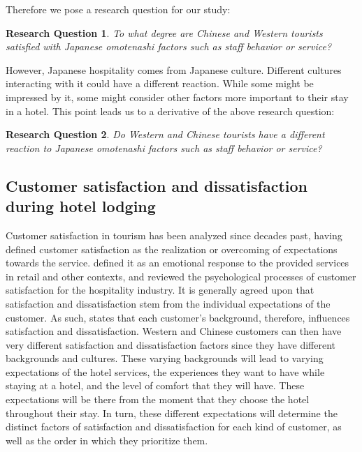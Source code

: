\documentclass[smallextended,natbib]{svjour3}       %
\makeatletter
\newtheorem{rsq}{Research Question}
\newcounter{subrsq}
\newenvironment{subrsq}
         {%
          \setcounter{subrsq}{0}%
          \stepcounter{rsq}%
          \edef\saved@rsq{\thersq}%
          \let\c@rsq\c@subrsq     %
          \renewcommand{\thersq}{\saved@rsq\alph{rsq}}%
         }
         {}
\makeatother
\begin{document}
    Therefore we pose a research question for our study:

    \begin{subrsq}
    \begin{rsq}
    \label{rsq:omotenashi}
    To what degree are Chinese and Western tourists satisfied with Japanese \textit{omotenashi} factors such as staff behavior or service?
    \end{rsq}

    However, Japanese hospitality comes from Japanese culture. Different cultures interacting with it could have a different reaction. While some might be impressed by it, some might consider other factors more important to their stay in a hotel. This point leads us to a derivative of the above research question:

    \begin{rsq}
    \label{rsq:omotenashi_both}
    Do Western and Chinese tourists have a different reaction to Japanese \textit{omotenashi} factors such as staff behavior or service?
    \end{rsq}
    \end{subrsq}

  \subsection{Customer satisfaction and dissatisfaction during hotel lodging}\label{theory_satisfaction}

    Customer satisfaction in tourism has been analyzed since decades past, \cite{hunt1975} having defined customer satisfaction as the realization or overcoming of expectations towards the service. \cite{oliver1981} defined it as an emotional response to the provided services in retail and other contexts, and \cite{oh1996} reviewed the psychological processes of customer satisfaction for the hospitality industry. It is generally agreed upon that satisfaction and dissatisfaction stem from the individual expectations of the customer. As such, \cite{engel1990} states that each customer's background, therefore, influences satisfaction and dissatisfaction. Western and Chinese customers can then have very different satisfaction and dissatisfaction factors since they have different backgrounds and cultures. These varying backgrounds will lead to varying expectations of the hotel services, the experiences they want to have while staying at a hotel, and the level of comfort that they will have. These expectations will be there from the moment that they choose the hotel throughout their stay. In turn, these different expectations will determine the distinct factors of satisfaction and dissatisfaction for each kind of customer, as well as the order in which they prioritize them. 
\end{document}
